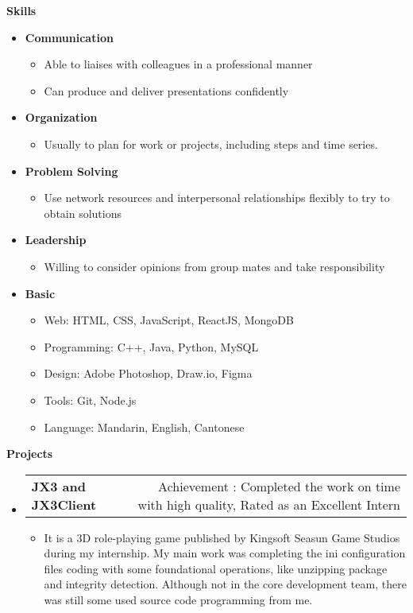 \documentclass[letterpaper,12pt]{article}[leftmargin=*]
\makeatletter
\def \entryspacing {-0pt}
\renewcommand{\section}[2]{\vspace{5pt}
  \colorbox{secondary}{\color{white}\raggedbottom\normalsize\textbf{{#1}{\hspace{7pt}#2}}}
}
\newcommand{\resumeEntryStart}{\begin{itemize}[leftmargin=2.5mm]}
\newcommand{\resumeEntryEnd}{\end{itemize}\vspace{\entryspacing}}
\newcommand{\resumeItemListStart}{\begin{itemize}[leftmargin=4.5mm]}
\newcommand{\resumeItemListEnd}{\end{itemize}}
\newcommand{\resumeItem}[1]{
  \item\small{
    {#1 \vspace{-2pt}}
  }
}
\newcommand{\resumeEntryTD}[2]{
  \vspace{-1pt}\item[]
    \begin{tabularx}{0.97\textwidth}{X@{\hspace{60pt}}r}
      \textbf{\color{primary}#1} & {\firabook\color{accent}\small#2} \\
    \end{tabularx}\vspace{-6pt}
}
\newcommand{\resumeEntryS}[2]{
  \item[]\small{
    \textbf{\color{primary}#1 }{ #2 \vspace{-6pt}}
  }
}
\makeatother
\begin{document}
\section{\faGears}{Skills}
 \resumeEntryStart
  \resumeEntryS{Communication } {}
      \resumeItemListStart
      \resumeItem{Able to liaises with colleagues in a professional manner}
      \resumeItem{Can produce and deliver presentations confidently}
      \resumeItemListEnd
    \resumeEntryS{Organization } {}
      \resumeItemListStart
      \resumeItem{Usually to plan for work or projects, including steps and time series.}
      \resumeItemListEnd
    \resumeEntryS{Problem Solving } {}
      \resumeItemListStart
      \resumeItem{Use network resources and interpersonal relationships flexibly to try to obtain solutions}
      \resumeItemListEnd
    \resumeEntryS{Leadership } {}
      \resumeItemListStart
      \resumeItem{Willing to consider opinions from group mates and take responsibility}
      \resumeItemListEnd
  \resumeEntryS{Basic } {}
      \resumeItemListStart
      \resumeItem{Web: HTML, CSS, JavaScript, ReactJS, MongoDB}
      \resumeItem{Programming: C++, Java, Python, MySQL}
      \resumeItem{Design: Adobe Photoshop, Draw.io, Figma}
      \resumeItem{Tools: Git, Node.js}
      \resumeItem{Language: Mandarin, English, Cantonese}
      \resumeItemListEnd
 \resumeEntryEnd


\section{\faFlask}{Projects}

  \resumeEntryStart
    \resumeEntryTD
      {JX3 and JX3Client}
      
      
      {Achievement : Completed the work on time with high quality, Rated as an  Excellent Intern}
    \resumeItemListStart
      \resumeItem {It is a 3D role-playing game published by Kingsoft Seasun Game Studios during my internship. My main work was completing the ini configuration files coding with some foundational operations, like unzipping package and integrity detection. Although not in the core development team, there was still some used source code programming from me.}
    \resumeItemListEnd
  \resumeEntryEnd
  
\end{document}
